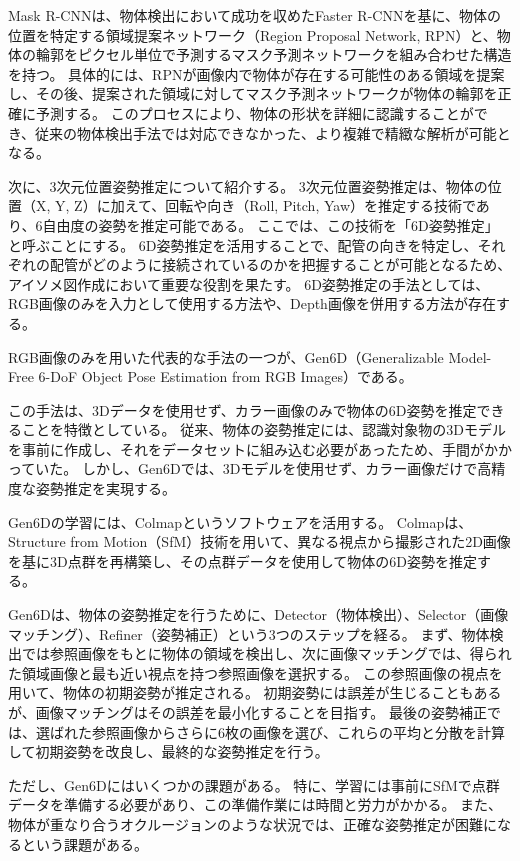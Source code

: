Mask R-CNNは、物体検出において成功を収めたFaster R-CNNを基に、物体の位置を特定する領域提案ネットワーク（Region Proposal Network, RPN）と、物体の輪郭をピクセル単位で予測するマスク予測ネットワークを組み合わせた構造を持つ。
具体的には、RPNが画像内で物体が存在する可能性のある領域を提案し、その後、提案された領域に対してマスク予測ネットワークが物体の輪郭を正確に予測する。
このプロセスにより、物体の形状を詳細に認識することができ、従来の物体検出手法では対応できなかった、より複雑で精緻な解析が可能となる。

次に、3次元位置姿勢推定について紹介する。
3次元位置姿勢推定は、物体の位置（X, Y, Z）に加えて、回転や向き（Roll, Pitch, Yaw）を推定する技術であり、6自由度の姿勢を推定可能である。
ここでは、この技術を「6D姿勢推定」と呼ぶことにする。
6D姿勢推定を活用することで、配管の向きを特定し、それぞれの配管がどのように接続されているのかを把握することが可能となるため、アイソメ図作成において重要な役割を果たす。
6D姿勢推定の手法としては、RGB画像のみを入力として使用する方法や、Depth画像を併用する方法が存在する。

RGB画像のみを用いた代表的な手法の一つが、Gen6D（Generalizable Model-Free 6-DoF Object Pose Estimation from RGB Images）である。


この手法は、3Dデータを使用せず、カラー画像のみで物体の6D姿勢を推定できることを特徴としている。
従来、物体の姿勢推定には、認識対象物の3Dモデルを事前に作成し、それをデータセットに組み込む必要があったため、手間がかかっていた。
しかし、Gen6Dでは、3Dモデルを使用せず、カラー画像だけで高精度な姿勢推定を実現する。

Gen6Dの学習には、Colmapというソフトウェアを活用する。
Colmapは、Structure from Motion（SfM）技術を用いて、異なる視点から撮影された2D画像を基に3D点群を再構築し、その点群データを使用して物体の6D姿勢を推定する。

Gen6Dは、物体の姿勢推定を行うために、Detector（物体検出）、Selector（画像マッチング）、Refiner（姿勢補正）という3つのステップを経る。
まず、物体検出では参照画像をもとに物体の領域を検出し、次に画像マッチングでは、得られた領域画像と最も近い視点を持つ参照画像を選択する。
この参照画像の視点を用いて、物体の初期姿勢が推定される。
初期姿勢には誤差が生じることもあるが、画像マッチングはその誤差を最小化することを目指す。
最後の姿勢補正では、選ばれた参照画像からさらに6枚の画像を選び、これらの平均と分散を計算して初期姿勢を改良し、最終的な姿勢推定を行う。

ただし、Gen6Dにはいくつかの課題がある。
特に、学習には事前にSfMで点群データを準備する必要があり、この準備作業には時間と労力がかかる。
また、物体が重なり合うオクルージョンのような状況では、正確な姿勢推定が困難になるという課題がある。

